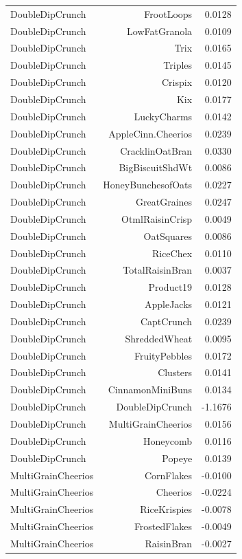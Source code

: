 \begin{longtable}{@{}lrr@{}}
DoubleDipCrunch & FrootLoops & 0.0128 \\
DoubleDipCrunch & LowFatGranola & 0.0109 \\
DoubleDipCrunch & Trix & 0.0165 \\
DoubleDipCrunch & Triples & 0.0145 \\
DoubleDipCrunch & Crispix & 0.0120 \\
DoubleDipCrunch & Kix & 0.0177 \\
DoubleDipCrunch & LuckyCharms & 0.0142 \\
DoubleDipCrunch & AppleCinn.Cheerios & 0.0239 \\
DoubleDipCrunch & CracklinOatBran & 0.0330 \\
DoubleDipCrunch & BigBiscuitShdWt & 0.0086 \\
DoubleDipCrunch & HoneyBunchesofOats & 0.0227 \\
DoubleDipCrunch & GreatGraines & 0.0247 \\
DoubleDipCrunch & OtmlRaisinCrisp & 0.0049 \\
DoubleDipCrunch & OatSquares & 0.0086 \\
DoubleDipCrunch & RiceChex & 0.0110 \\
DoubleDipCrunch & TotalRaisinBran & 0.0037 \\
DoubleDipCrunch & Product19 & 0.0128 \\
DoubleDipCrunch & AppleJacks & 0.0121 \\
DoubleDipCrunch & CaptCrunch & 0.0239 \\
DoubleDipCrunch & ShreddedWheat & 0.0095 \\
DoubleDipCrunch & FruityPebbles & 0.0172 \\
DoubleDipCrunch & Clusters & 0.0141 \\
DoubleDipCrunch & CinnamonMiniBuns & 0.0134 \\
DoubleDipCrunch & DoubleDipCrunch & -1.1676 \\
DoubleDipCrunch & MultiGrainCheerios & 0.0156 \\
DoubleDipCrunch & Honeycomb & 0.0116 \\
DoubleDipCrunch & Popeye & 0.0139 \\
MultiGrainCheerios & CornFlakes & -0.0100 \\
MultiGrainCheerios & Cheerios & -0.0224 \\
MultiGrainCheerios & RiceKrispies & -0.0078 \\
MultiGrainCheerios & FrostedFlakes & -0.0049 \\
MultiGrainCheerios & RaisinBran & -0.0027 \\

\end{longtable}
